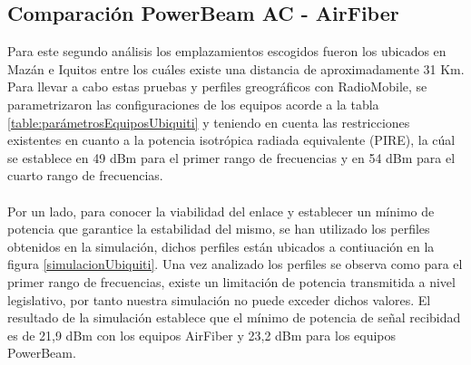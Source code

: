 \subsection{Comparación PowerBeam AC - AirFiber }
Para este segundo análisis los emplazamientos escogidos fueron los ubicados en Mazán e Iquitos entre los cuáles existe una distancia de aproximadamente 31 Km. Para llevar a cabo estas pruebas y perfiles greográficos con RadioMobile, se parametrizaron las configuraciones de los equipos acorde a la tabla \ref{table:parámetrosEquiposUbiquiti} y teniendo en cuenta las restricciones existentes en cuanto a la potencia isotrópica radiada equivalente (PIRE), la cúal se establece en 49 dBm para el primer rango de frecuencias y en 54 dBm para el cuarto rango de frecuencias.\\\\
Por un lado, para conocer la viabilidad del enlace y establecer un mínimo de potencia que garantice la estabilidad del mismo, se han utilizado los perfiles obtenidos en la simulación, dichos perfiles están ubicados a contiuación en la figura \ref{simulacionUbiquiti}. Una vez analizado los perfiles se observa como para el primer rango de frecuencias, existe un limitación de potencia transmitida a nivel legislativo, por tanto nuestra simulación no puede exceder dichos valores. El resultado de la simulación establece que el mínimo de potencia de señal recibidad es de 21,9 dBm con los equipos AirFiber y 23,2 dBm para los equipos PowerBeam.

